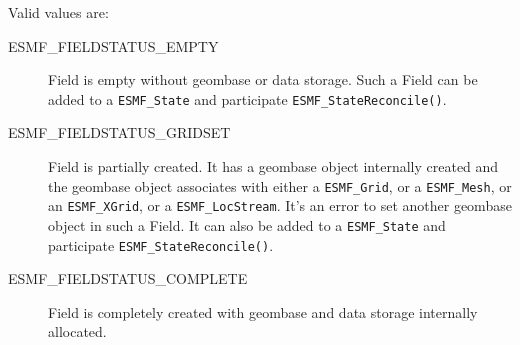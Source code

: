 Valid values are:
\begin{description}
\item [ESMF\_FIELDSTATUS\_EMPTY]
      Field is empty without geombase or data storage. Such a Field can be added to a {\tt ESMF\_State} and participate {\tt ESMF\_StateReconcile()}. 
\item [ESMF\_FIELDSTATUS\_GRIDSET]
      Field is partially created. It has a geombase object internally created and the geombase object associates with either a {\tt ESMF\_Grid}, or a {\tt ESMF\_Mesh}, or an {\tt ESMF\_XGrid}, or a {\tt ESMF\_LocStream}. It's an error to set another geombase object in such a Field. It can also be added to a {\tt ESMF\_State} and participate {\tt ESMF\_StateReconcile()}.
\item [ESMF\_FIELDSTATUS\_COMPLETE]
      Field is completely created with geombase and data storage internally allocated. 

\end{description}


